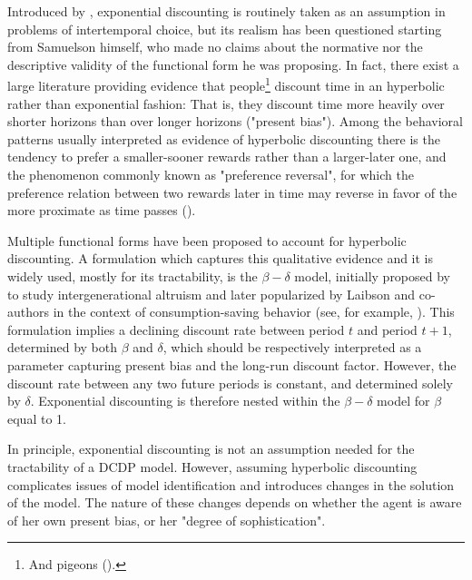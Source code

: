 
Introduced by \textcite{Samuelson1937}, exponential discounting is routinely taken as an assumption in problems of intertemporal choice, but its realism has been questioned starting from Samuelson himself, who made no claims about the normative nor the descriptive validity of the functional form he was proposing. In fact, there exist a large literature providing evidence that people\footnote{And pigeons (\cite{AinslieHerrnstein1981}).} discount time in an hyperbolic rather than exponential fashion: That is, they discount time more heavily over shorter horizons than over longer horizons ("present bias").
Among the behavioral patterns usually interpreted as evidence of hyperbolic discounting there is the tendency to prefer a smaller-sooner rewards rather than a larger-later one, and the phenomenon commonly known as "preference reversal", for which the preference relation between two rewards later in time may reverse in favor of the more proximate as time passes (\cite{Thaler1981}).

Multiple functional forms have been proposed to account for hyperbolic discounting. A formulation which captures this qualitative evidence and it is widely used, mostly for its tractability, is the $\beta-\delta$ model, initially proposed by \textcite{PhelpsPollak1968} to study intergenerational altruism and later popularized by Laibson and co-authors in the context of consumption-saving behavior (see, for example, \cite{AngeletosLaibson2001}).
This formulation implies a declining discount rate between period $t$ and period $t+1$, determined by both $\beta$ and $\delta$, which should be respectively interpreted as a parameter capturing present bias and the long-run discount factor. However, the discount rate between any two future periods is constant, and determined solely by $\delta$. Exponential discounting is therefore nested within the $\beta-\delta$ model for $\beta$ equal to 1.


In principle, exponential discounting is not an assumption needed for the tractability of a DCDP model. However, assuming hyperbolic discounting complicates issues of model identification and introduces changes in the solution of the model. The nature of these changes depends on whether the agent is aware of her own present bias, or her "degree of sophistication".

